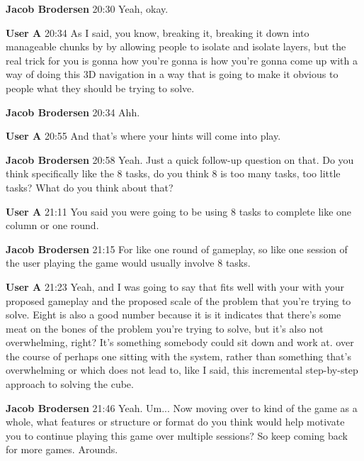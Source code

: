\documentclass{article}
\begin{document}
\noindent \textbf{Jacob Brodersen}   20:30
Yeah, okay.

\noindent \textbf{User A}   20:34
As I said, you know, breaking it, breaking it down into manageable chunks by by allowing people to isolate and isolate layers, but the real trick for you is gonna how you're gonna is how you're gonna come up with a way of doing this 3D navigation in a way that is going to make it obvious to people what they should be trying to solve.

\noindent \textbf{Jacob Brodersen}   20:34
Ahh.

\noindent \textbf{User A}   20:55
And that's where your hints will come into play.

\noindent \textbf{Jacob Brodersen}   20:58
Yeah.
Just a quick follow-up question on that. Do you think specifically like the 8 tasks, do you think 8 is too many tasks, too little tasks? What do you think about that?

\noindent \textbf{User A}   21:11
You said you were going to be using 8 tasks to complete like one column or one round.

\noindent \textbf{Jacob Brodersen}   21:15
For like one round of gameplay, so like one session of the user playing the game would usually involve 8 tasks.

\noindent \textbf{User A}   21:23
Yeah, and I was going to say that fits well with your with your proposed gameplay and the proposed scale of the problem that you're trying to solve. Eight is also a good number because it is it indicates that there's some meat on the bones of the problem you're trying to solve, but it's also not overwhelming, right? It's something somebody could sit down and work at.
over the course of perhaps one sitting with the system, rather than something that's overwhelming or which does not lead to, like I said, this incremental step-by-step approach to solving the cube.

\noindent \textbf{Jacob Brodersen}   21:46
Yeah.
Um...
Now moving over to kind of the game as a whole, what features or structure or format do you think would help motivate you to continue playing this game over multiple sessions? So keep coming back for more games.
Arounds.
\end{document}
